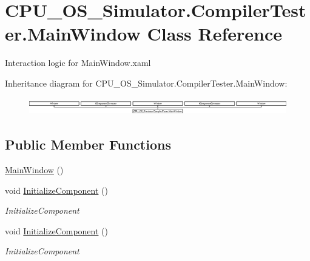 \hypertarget{class_c_p_u___o_s___simulator_1_1_compiler_tester_1_1_main_window}{}\section{C\+P\+U\+\_\+\+O\+S\+\_\+\+Simulator.\+Compiler\+Tester.\+Main\+Window Class Reference}
\label{class_c_p_u___o_s___simulator_1_1_compiler_tester_1_1_main_window}


Interaction logic for Main\+Window.\+xaml  


Inheritance diagram for C\+P\+U\+\_\+\+O\+S\+\_\+\+Simulator.\+Compiler\+Tester.\+Main\+Window\+:\begin{figure}[H]
\begin{center}
\leavevmode
\includegraphics[height=0.761905cm]{class_c_p_u___o_s___simulator_1_1_compiler_tester_1_1_main_window}
\end{center}
\end{figure}
\subsection*{Public Member Functions}
\begin{DoxyCompactItemize}
\item 
\hyperlink{class_c_p_u___o_s___simulator_1_1_compiler_tester_1_1_main_window_a067de72c2192f57acab21aec73dd8074}{Main\+Window} ()
\item 
void \hyperlink{class_c_p_u___o_s___simulator_1_1_compiler_tester_1_1_main_window_a660feb0d1d06a39586989a4a9e5352ce}{Initialize\+Component} ()
\begin{DoxyCompactList}\small\item\em Initialize\+Component \end{DoxyCompactList}\item 
void \hyperlink{class_c_p_u___o_s___simulator_1_1_compiler_tester_1_1_main_window_a660feb0d1d06a39586989a4a9e5352ce}{Initialize\+Component} ()
\begin{DoxyCompactList}\small\item\em Initialize\+Component \end{DoxyCompactList}\end{DoxyCompactItemize}
